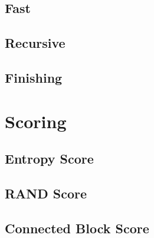 		\subsection{Fast}
			\clearpage
		
		\subsection{Recursive}
			\clearpage
		
		\subsection{Finishing}
			\clearpage
	
	\section{Scoring}
	
		\subsection{Entropy Score}
			\clearpage
		
		\subsection{RAND Score}
			\clearpage
		
		\subsection{Connected Block Score}
			\clearpage
